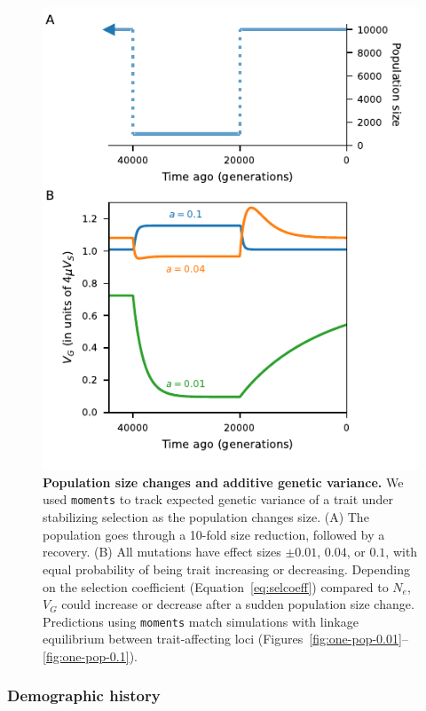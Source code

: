 \documentclass{article}
\newcommand{\moments}{\texttt{moments}\xspace}
\begin{document}
\begin{figure}[tb!]
    \centering
    \includegraphics{../figures/one_pop.pdf}
    \caption{
        \textbf{Population size changes and additive genetic variance.}
        We used \moments to track expected genetic variance of a trait
        under stabilizing selection as the population changes size. (A) The
        population goes through a 10-fold size reduction, followed by a recovery.
        (B) All mutations have effect sizes $\pm0.01$, $0.04$, or $0.1$, with equal
        probability of being trait increasing or decreasing. Depending on the
        selection coefficient (Equation~\ref{eq:selcoeff}) compared to $N_e$, $V_G$
        could increase or decrease after a sudden population size change.
        Predictions using \moments match simulations with linkage equilibrium
        between trait-affecting loci
        (Figures~\ref{fig:one-pop-0.01}--\ref{fig:one-pop-0.1}).
    }
    \label{fig:one-pop}
\end{figure}

\subsubsection*{Demographic history}
\end{document}

